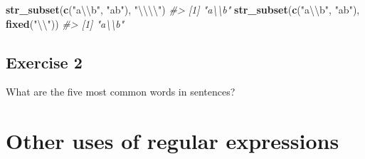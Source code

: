 \documentclass[]{book}
\newenvironment{Shaded}{\begin{snugshade}}{\end{snugshade}}
\newcommand{\CharTok}[1]{\textcolor[rgb]{0.31,0.60,0.02}{#1}}
\newcommand{\CommentTok}[1]{\textcolor[rgb]{0.56,0.35,0.01}{\textit{#1}}}
\newcommand{\DataTypeTok}[1]{\textcolor[rgb]{0.13,0.29,0.53}{#1}}
\newcommand{\DecValTok}[1]{\textcolor[rgb]{0.00,0.00,0.81}{#1}}
\newcommand{\KeywordTok}[1]{\textcolor[rgb]{0.13,0.29,0.53}{\textbf{#1}}}
\newcommand{\NormalTok}[1]{#1}
\newcommand{\OperatorTok}[1]{\textcolor[rgb]{0.81,0.36,0.00}{\textbf{#1}}}
\newcommand{\OtherTok}[1]{\textcolor[rgb]{0.56,0.35,0.01}{#1}}
\newcommand{\StringTok}[1]{\textcolor[rgb]{0.31,0.60,0.02}{#1}}
\theoremstyle{plain}
\theoremstyle{remark}
\theoremstyle{definition}
\theoremstyle{definition}
\theoremstyle{definition}
\theoremstyle{remark}
\begin{document}
\begin{Shaded}
\begin{Highlighting}[]
\KeywordTok{str_subset}\NormalTok{(}\KeywordTok{c}\NormalTok{(}\StringTok{"a}\CharTok{\textbackslash{}\textbackslash{}}\StringTok{b"}\NormalTok{, }\StringTok{"ab"}\NormalTok{), }\StringTok{"}\CharTok{\textbackslash{}\textbackslash{}\textbackslash{}\textbackslash{}}\StringTok{"}\NormalTok{)}
\CommentTok{#> [1] "a\textbackslash{}\textbackslash{}b"}
\KeywordTok{str_subset}\NormalTok{(}\KeywordTok{c}\NormalTok{(}\StringTok{"a}\CharTok{\textbackslash{}\textbackslash{}}\StringTok{b"}\NormalTok{, }\StringTok{"ab"}\NormalTok{), }\KeywordTok{fixed}\NormalTok{(}\StringTok{"}\CharTok{\textbackslash{}\textbackslash{}}\StringTok{"}\NormalTok{))}
\CommentTok{#> [1] "a\textbackslash{}\textbackslash{}b"}
\end{Highlighting}
\end{Shaded}

\hypertarget{exercise-2-39}{%
\subsection{Exercise 2}\label{exercise-2-39}}

What are the five most common words in sentences?

\begin{Shaded}
\end{Shaded}

\hypertarget{other-uses-of-regular-expressions}{%
\section{Other uses of regular
expressions}\label{other-uses-of-regular-expressions}}
\end{document}

